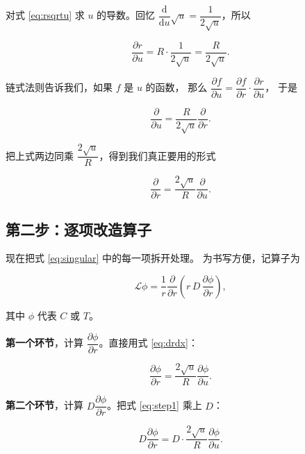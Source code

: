 对式 \eqref{eq:rsqrtu} 求 $u$ 的导数。回忆 $\dfrac{\mathrm{d}}{\mathrm{d}u}\sqrt{u}
= \dfrac{1}{2\sqrt{u}}$，所以

\begin{equation}
\frac{\partial r}{\partial u} = R\cdot\frac{1}{2\sqrt{u}} = \frac{R}{2\sqrt{u}}.
\label{eq:drdu}
\end{equation}

链式法则告诉我们，如果 $f$ 是 $u$ 的函数，
那么 $\dfrac{\partial f}{\partial u}=\dfrac{\partial f}{\partial r}\cdot\dfrac{\partial r}{\partial u}$，
于是

\begin{equation}
\frac{\partial}{\partial u} = \frac{R}{2\sqrt{u}}\frac{\partial}{\partial r}.
\end{equation}

把上式两边同乘 $\dfrac{2\sqrt{u}}{R}$，得到我们真正要用的形式

\begin{equation}
\boxed{\;\frac{\partial}{\partial r} = \frac{2\sqrt{u}}{R}\frac{\partial}{\partial u}.\;}
\label{eq:drdx}
\end{equation}

\subsection{第二步：逐项改造算子}

现在把式 \eqref{eq:singular} 中的每一项拆开处理。
为书写方便，记算子为

\begin{equation}
\mathcal{L}\phi = \frac{1}{r}\frac{\partial}{\partial r}\left(r\,D\,\frac{\partial\phi}{\partial r}\right),
\end{equation}

其中 $\phi$ 代表 $C$ 或 $T$。

\textbf{第一个环节}，计算 $\dfrac{\partial\phi}{\partial r}$。直接用式 \eqref{eq:drdx}：

\begin{equation}
\frac{\partial\phi}{\partial r} = \frac{2\sqrt{u}}{R}\frac{\partial\phi}{\partial u}.
\label{eq:step1}
\end{equation}

\textbf{第二个环节}，计算 $D\dfrac{\partial\phi}{\partial r}$。把式 \eqref{eq:step1} 乘上 $D$：

\begin{equation}
D\frac{\partial\phi}{\partial r} = D\cdot\frac{2\sqrt{u}}{R}\frac{\partial\phi}{\partial u}.
\label{eq:step2}
\end{equation}

